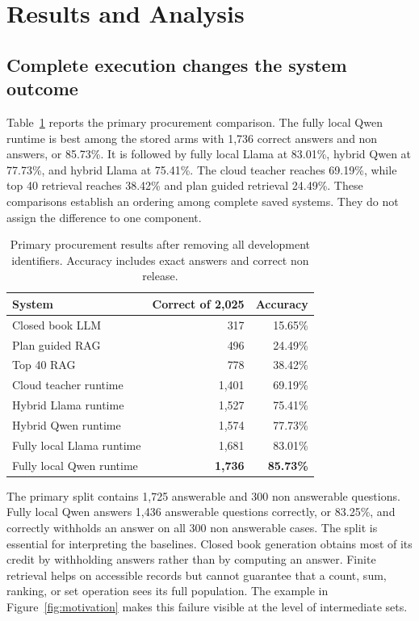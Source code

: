 \documentclass{article}
\begin{document}
\section{Results and Analysis}
\label{sec:results}

\subsection{Complete execution changes the system outcome}

Table~\ref{tab:main-results} reports the primary procurement comparison.  The fully local Qwen
runtime is best among the stored arms with 1,736 correct answers and non answers, or 85.73\%.
It is followed by fully local Llama at 83.01\%, hybrid Qwen at 77.73\%, and hybrid Llama at
75.41\%.  The cloud teacher reaches 69.19\%, while top 40 retrieval reaches 38.42\% and plan
guided retrieval 24.49\%.  These comparisons establish an ordering among complete saved systems.
They do not assign the difference to one component.

\begin{table}[t]
  \centering
  \caption{Primary procurement results after removing all development identifiers.  Accuracy
  includes exact answers and correct non release.}
  \label{tab:main-results}
  \small
  \begin{tabular}{lrr}
    \toprule
    System & Correct of 2,025 & Accuracy \\
    \midrule
    Closed book LLM & 317 & 15.65\% \\
    Plan guided RAG & 496 & 24.49\% \\
    Top 40 RAG & 778 & 38.42\% \\
    Cloud teacher runtime & 1,401 & 69.19\% \\
    Hybrid Llama runtime & 1,527 & 75.41\% \\
    Hybrid Qwen runtime & 1,574 & 77.73\% \\
    Fully local Llama runtime & 1,681 & 83.01\% \\
    Fully local Qwen runtime & \textbf{1,736} & \textbf{85.73\%} \\
    \bottomrule
  \end{tabular}
\end{table}

The primary split contains 1,725 answerable and 300 non answerable questions.  Fully local Qwen
answers 1,436 answerable questions correctly, or 83.25\%, and correctly withholds an answer on all
300 non answerable cases.  The split is essential for interpreting the baselines.  Closed book
generation obtains most of its credit by withholding answers rather than by computing an answer.
Finite retrieval helps on accessible records but cannot guarantee that a count, sum, ranking, or
set operation sees its full population.  The example in Figure~\ref{fig:motivation} makes this
failure visible at the level of intermediate sets.
\end{document}
